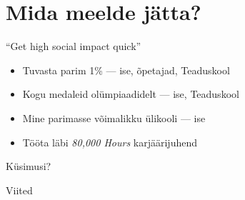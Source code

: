 \documentclass{beamer}
\begin{document}
\section{Mida meelde jätta?}

\begin{frame}{``Get \alert{high social impact} quick''}

  \begin{itemize}
  \item Tuvasta parim 1\% --- ise, õpetajad, Teaduskool
  \item Kogu medaleid olümpiaadidelt --- ise, Teaduskool
  \item Mine parimasse võimalikku ülikooli --- ise
  \item Tööta läbi \emph{80,000 Hours} karjäärijuhend
  \end{itemize}

\end{frame}

\begin{frame}[standout]
  Küsimusi?
\end{frame}

\appendix

\begin{frame}[allowframebreaks]{Viited}

  
  

\end{frame}
\end{document}
